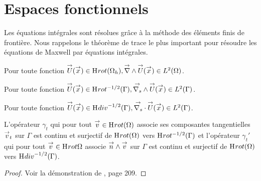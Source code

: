 \section{Espaces fonctionnels}
  Les équations intégrales sont résolues grâce à la méthode des éléments finis de frontière. Nous rappelons le théorème de trace le plus important pour résoudre les équations de Maxwell par équations intégrales.

  \begin{defn}
    Pour toute fonction \(\vect{U}(\vx) \in \Hrot(\OO_h), \vrot \vect{U}(\vx) \in L^2(\OO)\).

    Pour toute fonction \(\vect{U}(\vx) \in \Hrot^{-1/2}(\Gamma), \vrots \vect{U}(\vx) \in L^2(\Gamma)\).

    Pour toute fonction \(\vect{U}(\vx) \in \Hdiv^{-1/2}(\Gamma), \vdivs \vect{U}(\vx) \in L^2(\Gamma)\).
  \end{defn}
  \begin{thm}
    L'opérateur \(\gamma_t\) qui pour tout  \(\vect{v}\in\Hrot(\OO)\) associe ses composantes tangentielles \(\vect{v}_t\) sur \(\Gamma\) est continu et surjectif de \(\Hrot(\OO)\) vers \(\Hrot^{-1/2}(\Gamma)\) et l'opérateur \(\gamma_t'\) qui pour tout  \(\vect{v}\in\Hrot{\OO}\) associe \(\vn \pvect \vect{v}\) sur \(\Gamma\) est continu et surjectif de \(\Hrot(\OO)\) vers \(\Hdiv^{-1/2}(\Gamma)\).
  \end{thm}
  \begin{proof}
    Voir la démonstration de \cite[Théorème~5.4.2]{nedelec_acoustic_2001}, page 209.
  \end{proof}
